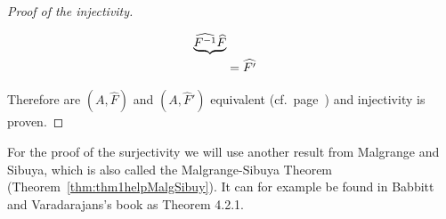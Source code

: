 \begin{proof}[Proof of the injectivity]
\begin{itemize}
\begin{align*}
{{            \underbrace{%
              \hat{F^{-1}} \hat F
            }
          }
        }
        \\&= \hat{F'}
      \end{align*}
  \end{itemize}
  Therefore are $(A,\hat F)$ and $(A,\hat F')$ equivalent
  (cf.\ page~\pageref{page:ofDefnOfIsomOfMarkedPairs}) and injectivity is
  proven.
  \iffalse
    \begin{comment}
      \textbf{First look at injectivity:}
      Consider the two elements $(\cM,\nabla,\hat f)$ and
      $(\cM',\nabla',\hat f')$ of $\cH(\cM^{nf},\nabla^{nf})$ which map to same
      cohomology class
      \[
        \exp((\cM,\nabla,\hat f))=\lambda=\exp((\cM',\nabla',\hat f'))
          \in H^1(S^1;\Lambda(A^0)) \,.
      \]
      Since we can use refined coverings, it is possible to find a finite
      covering $\cU=\{U_j;j\in J\}$ of $S^1$ such that $\lambda$ is the class
      of the cocycles $(f_lf_j^{-1})$ and $(f_l',f_j'^{-1})$, where
      $f_j$,$f_j'$ are defined on $U_j$.
      Since $[(f_lf_j^{-1})]=[(f_l'f_j'^{-1})]$ there exists a $0$-cochain
      $(g_j)$ of the sheaf $\Aut^{<0}(\tilde\cM^{nf})$ relative to the covering
      $(I_j)$, such that
      \[
        f_l'f_j'^{-1}=g_lf_lf_j^{-1}g_j^{-1} \text{ on } I_j\cap I_l.
      \]
      If we set $\sigma=f_j^{-1}g_{j}^{-1}f_j'$ on $I_{j}$, we get a horizontal
      section\TODO[~on~???], thus\TODO[why?] it satisfies
      $\sigma\circ\hat{f'}=\hat f$. Therefore are $(\cM,\nabla,\hat f)$ and
      $(\cM',\nabla',\hat{f'})$ isomorphic and injectivity is proven.
    \end{comment}
  \fi
\end{proof}

For the proof of the surjectivity we will use another result from Malgrange and
Sibuya, which is also called the Malgrange-Sibuya Theorem
(Theorem~\ref{thm:thm1helpMalgSibuy}). It can for example be found in Babbitt
and Varadarajans's book \cite[65ff]{babbitt1989local} as Theorem 4.2.1.

